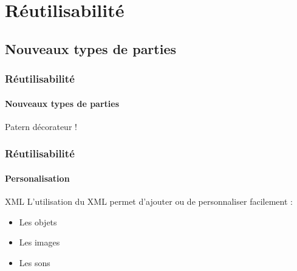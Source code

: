 \section{Réutilisabilité}
\subsection{Nouveaux types de parties}

	\begin{frame}
	\frametitle{Réutilisabilité}
	\framesubtitle{Nouveaux types de parties}
	
		Patern décorateur !
	
	\end{frame}
	

	\begin{frame}
	\frametitle{Réutilisabilité}
	\framesubtitle{Personalisation}
	
		\begin{block}{XML}
			L'utilisation du XML permet d'ajouter ou de personnaliser facilement :
			\begin{itemize}
				\item Les objets
				\item Les images
				\item Les sons
			\end{itemize}
		\end{block}
	
	\end{frame}